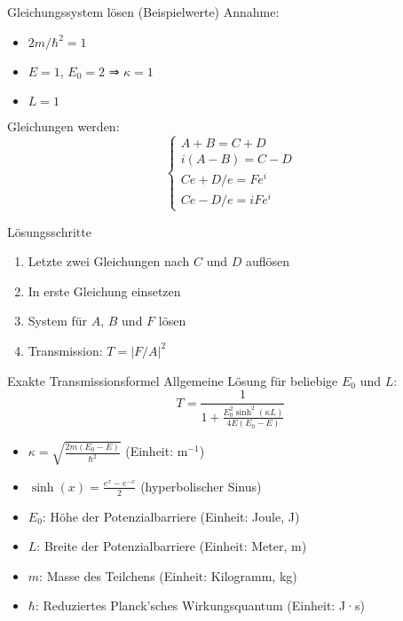 \documentclass{beamer}
\begin{document}
    \begin{frame}{Gleichungssystem lösen (Beispielwerte)}
        Annahme:
        \begin{itemize}
            \item $2m/\hbar^2 = 1$
            \item $E = 1$, $E_0 = 2$ ⇒ $\kappa = 1$
            \item $L = 1$
        \end{itemize}

        Gleichungen werden:
        \[
            \begin{cases}
                A + B = C + D \\
                i(A - B) = C - D \\
                Ce + D/e = Fe^i \\
                Ce - D/e = iFe^i
            \end{cases}
        \]
    \end{frame}

    \begin{frame}{Lösungsschritte}
        \begin{enumerate}
            \item Letzte zwei Gleichungen nach $C$ und $D$ auflösen
            \item In erste Gleichung einsetzen
            \item System für $A$, $B$ und $F$ lösen
            \item Transmission: $T = |F/A|^2$
        \end{enumerate}

    \end{frame}

    \begin{frame}{Exakte Transmissionsformel}
        Allgemeine Lösung für beliebige \( E_0 \) und \( L \):
        \[
            T = \frac{1}{1 + \frac{E_0^2 \sinh^2(\kappa L)}{4E(E_0 - E)}}
        \]
        \begin{itemize}
            \item \( \kappa = \sqrt{\frac{2m(E_0 - E)}{\hbar^2}} \) (Einheit: \( \text{m}^{-1} \))
            \item \( \sinh(x) = \frac{e^x - e^{-x}}{2} \) (hyperbolischer Sinus)
            \item \( E_0 \): Höhe der Potenzialbarriere (Einheit: Joule, J)
            \item \( L \): Breite der Potenzialbarriere (Einheit: Meter, m)
            \item \( m \): Masse des Teilchens (Einheit: Kilogramm, kg)
            \item \( \hbar \): Reduziertes Planck'sches Wirkungsquantum (Einheit: J·s)
        \end{itemize}
    \end{frame}
\end{document}
